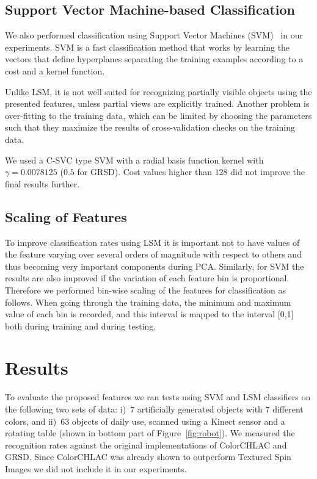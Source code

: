 \documentclass[conference]{sty/IEEEtran}
\begin{document}
\subsection{Support Vector Machine-based Classification}
We also performed classification using Support Vector Machines (SVM)~\cite{svm99} in our experiments.
SVM is a fast classification method that works by learning the vectors that define hyperplanes separating
the training examples according to a cost and a kernel function.

Unlike LSM, it is not well suited for recognizing partially visible objects using the presented features,
unless partial views are explicitly trained. Another problem is over-fitting to the training data, which
can be limited by choosing the parameters such that they maximize the results of cross-validation checks
on the training data.

We used a C-SVC type SVM with a radial basis function kernel \cite{LIBSVM} with $\gamma = 0.0078125$
($0.5$ for GRSD). Cost values higher than $128$ did not improve the final results further.

\subsection{Scaling of Features}
To improve classification rates using LSM it is important not to have values of the feature 
varying over several orders of magnitude with respect to others and thus becoming very important components
during PCA. Similarly, for SVM the results are also improved if the variation of each feature bin is
proportional. Therefore we performed bin-wise scaling of the features for classification as follows.
When going through the training data, the minimum and maximum value of each bin is recorded, and this interval 
is mapped to the interval [0,1] both during training and during testing.


\section{Results}
\label{sec:results}
To evaluate the proposed features we ran
tests using SVM and LSM classifiers on the following two sets of data: 
i)~7 artificially generated objects with 7 different colors, and
ii)~63 objects of daily use, scanned using a Kinect sensor and a rotating table
(shown in bottom part of Figure~\ref{fig:robot}). 
We measured the recognition rates against the original implementations of ColorCHLAC and 
GRSD. Since ColorCHLAC was already shown to outperform Textured Spin Images
we did not include it in our experiments.
\end{document}
